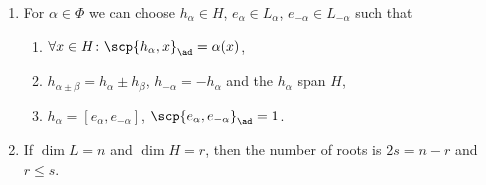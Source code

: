 \begin{enumerate}[label=(\roman*)]
	\item For $\alpha \in \Phi$ we can choose $h_\alpha \in H$,
		$e_\alpha \in L_\alpha$, $e_{-\alpha} \in L_{-\alpha}$
		such that
		\begin{enumerate}[label=(\alph*)]
			\item $\forall x \in H\colon \scp{h_\alpha, x}_{\ad} = \alpha(x)$,
			\item $h_{\alpha \pm\beta} = h_{\alpha} \pm h_{\beta}$,
				$h_{-\alpha} = -h_{\alpha}$ and the $h_{\alpha}$ span $H$,
			\item $h_{\alpha} = [e_\alpha, e_{-\alpha}]$, $\scp{e_\alpha, e_{-\alpha}}_{\ad} = 1$.
	\end{enumerate}
\item If $\dim L = n$ and $\dim H = r$, then the number of roots is $2s = n-r$ and
	$r\leq s$.
\end{enumerate}
